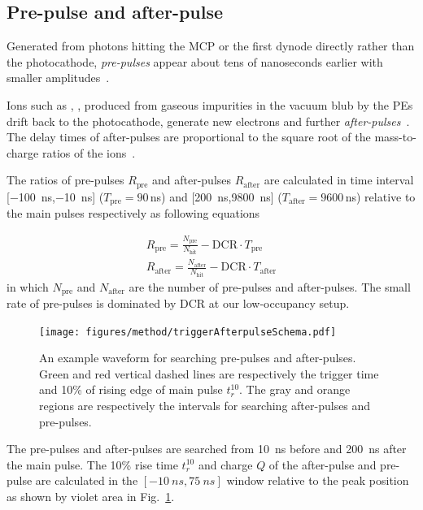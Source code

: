 \subsection{Pre-pulse and after-pulse}
\label{sec:afterpulse}
Generated from photons hitting the MCP or the first dynode directly rather than the photocathode, \emph{pre-pulses} appear about tens of nanoseconds earlier with smaller amplitudes~\cite{JUNOMassTesting}.

Ions such as , ,  produced from gaseous impurities in the vacuum blub by the PEs drift back to the photocathode, generate new electrons and further \emph{after-pulses}~\cite{JUNOMassTesting,Coates_1973}. The delay times of after-pulses are proportional to the square root of the mass-to-charge ratios of the ions~\cite{XENON1TTesting,Coates_1973,afterpulseTime}. %

The ratios of pre-pulses $R_{\mathrm{pre}}$ and after-pulses $R_{\mathrm{after}}$ are calculated in time interval [\SI{-100}{ns},\SI{-10}{ns}] ($T_{\mathrm{pre}}=90$\,ns) and [\SI{200}{ns},\SI{9800}{ns}] ($T_{\mathrm{after}}=9600$\,ns) relative to the main pulses respectively as following equations

\begin{align}
    R_{\mathrm{pre}} = \frac{N_{\mathrm{pre}}}{N_\mathrm{hit}} - \mathrm{DCR}\cdot T_{\mathrm{pre}}\\
    R_{\mathrm{after}} = \frac{N_{\mathrm{after}}}{N_\mathrm{hit}} - \mathrm{DCR}\cdot T_{\mathrm{after}}
\end{align}
in which $N_{\mathrm{pre}}$ and $N_{\mathrm{after}}$ are the number of pre-pulses and after-pulses. The small rate of pre-pulses is dominated by DCR at our low-occupancy setup.

\begin{figure}
    \centering
    \texttt{[image: figures/method/triggerAfterpulseSchema.pdf]}
    \caption{An example waveform for searching pre-pulses and after-pulses. Green and red vertical dashed lines are respectively the trigger time and 10\% of rising edge of main pulse $t_r^{10}$. The gray and orange regions are respectively the intervals for searching after-pulses and pre-pulses.}
    \label{fig:afterpulseSchema}
\end{figure}



The pre-pulses and after-pulses are searched from \SI{10}{ns} before and \SI{200}{ns} after the main pulse. The 10\% rise time $t_r^{10}$ and charge $Q$ of the after-pulse and pre-pulse are calculated in the $[-\SI{10}{ns},\SI{75}{ns}]$ window relative to the peak position as shown by violet area in Fig.~\ref{fig:afterpulseSchema}.


